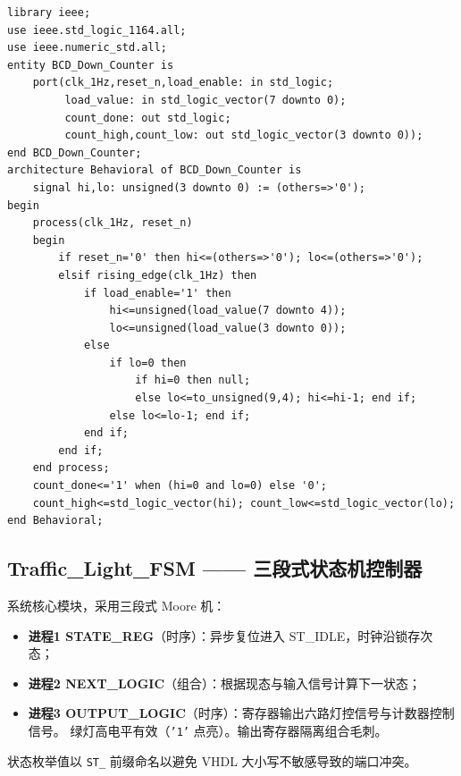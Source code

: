 \documentclass[12pt,a4paper]{ctexart}
\begin{document}
\begin{lstlisting}[caption={BCD\_Down\_Counter.vhd}]
library ieee;
use ieee.std_logic_1164.all;
use ieee.numeric_std.all;
entity BCD_Down_Counter is
    port(clk_1Hz,reset_n,load_enable: in std_logic;
         load_value: in std_logic_vector(7 downto 0);
         count_done: out std_logic;
         count_high,count_low: out std_logic_vector(3 downto 0));
end BCD_Down_Counter;
architecture Behavioral of BCD_Down_Counter is
    signal hi,lo: unsigned(3 downto 0) := (others=>'0');
begin
    process(clk_1Hz, reset_n)
    begin
        if reset_n='0' then hi<=(others=>'0'); lo<=(others=>'0');
        elsif rising_edge(clk_1Hz) then
            if load_enable='1' then
                hi<=unsigned(load_value(7 downto 4));
                lo<=unsigned(load_value(3 downto 0));
            else
                if lo=0 then
                    if hi=0 then null;
                    else lo<=to_unsigned(9,4); hi<=hi-1; end if;
                else lo<=lo-1; end if;
            end if;
        end if;
    end process;
    count_done<='1' when (hi=0 and lo=0) else '0';
    count_high<=std_logic_vector(hi); count_low<=std_logic_vector(lo);
end Behavioral;
\end{lstlisting}

\subsection{Traffic\_Light\_FSM —— 三段式状态机控制器}

系统核心模块，采用三段式 Moore 机：

\begin{itemize}[itemsep=1pt]
    \item \textbf{进程1 STATE\_REG}（时序）：异步复位进入 ST\_IDLE，时钟沿锁存次态；
    \item \textbf{进程2 NEXT\_LOGIC}（组合）：根据现态与输入信号计算下一状态；
    \item \textbf{进程3 OUTPUT\_LOGIC}（时序）：寄存器输出六路灯控信号与计数器控制信号。
          绿灯高电平有效（\texttt{'1'} 点亮）。输出寄存器隔离组合毛刺。
\end{itemize}

状态枚举值以 \texttt{ST\_} 前缀命名以避免 VHDL 大小写不敏感导致的端口冲突。
\end{document}
